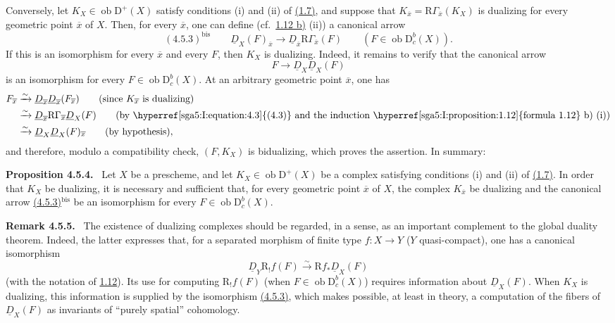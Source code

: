 \documentclass[11pt]{article}
\newenvironment{statement}[1]{\par\medskip\noindent\textbf{#1.}\ }{\par\medskip}
\newcommand{\R}{\mathrm{R}}
\newcommand{\D}{\mathrm{D}}
\newcommand{\ob}{\operatorname{ob}}
\newcommand{\ol}[1]{\overline{#1}}
\providecommand{\ob}{\operatorname{ob}}
\providecommand{\R}{\mathrm R}
\begin{document}
Conversely, let $K_X\in\ob\D^+(X)$ satisfy conditions (i) and (ii) of \hyperref[sga5:I:definition:1.7]{(1.7)}, and suppose that $K_{\ol{x}}=\R\Gamma_{\ol{x}}(K_X)$ is dualizing for every geometric point $\ol{x}$ of $X$. Then, for every $\ol{x}$, one can define (cf.~\hyperref[sga5:I:proposition:1.12]{1.12 b)} (ii)) a canonical arrow
\label{sga5:I:equation:4.5.3-mathrm-bis}\[
(4.5.3)^{\mathrm{bis}}\qquad \underline{D}_X(F)_{\ol{x}}\longrightarrow \underline{D}_{\ol{x}}\R\Gamma_{\ol{x}}(F)\qquad (F\in\ob\D_c^b(X)).
\]
If this is an isomorphism for every $\ol{x}$ and every $F$, then $K_X$ is dualizing. Indeed, it remains to verify that the canonical arrow
\[
F\longrightarrow \underline{D}_X\underline{D}_X(F)
\]
is an isomorphism for every $F\in\ob\D_c^b(X)$. At an arbitrary geometric point $\ol{x}$, one has
\[
\begin{aligned}
F_{\ol{x}}&\xrightarrow{\sim}\underline{D}_{\ol{x}}\underline{D}_{\ol{x}}(F_{\ol{x}})\qquad\text{(since $K_{\ol{x}}$ is dualizing)}\\
&\xrightarrow{\sim}\underline{D}_{\ol{x}}\R\Gamma_{\ol{x}}\underline{D}_X(F)\qquad\text{(by \hyperref[sga5:I:equation:4.3]{(4.3)} and the induction \hyperref[sga5:I:proposition:1.12]{formula 1.12} b) (i))}\\
&\xrightarrow{\sim}\underline{D}_X\underline{D}_X(F)_{\ol{x}}\qquad\text{(by hypothesis)},
\end{aligned}
\]
and therefore, modulo a compatibility check, $(F,K_X)$ is bidualizing, which proves the assertion. In summary:

\label{sga5:I:proposition:4.5.4}\begin{statement}{Proposition 4.5.4}
Let $X$ be a prescheme, and let $K_X\in\ob\D^+(X)$ be a complex satisfying conditions (i) and (ii) of \hyperref[sga5:I:definition:1.7]{(1.7)}. In order that $K_X$ be dualizing, it is necessary and sufficient that, for every geometric point $\ol{x}$ of $X$, the complex $K_{\ol{x}}$ be dualizing and the canonical arrow \hyperref[sga5:I:equation:4.5.3]{(4.5.3)}$^{\mathrm{bis}}$ be an isomorphism for every $F\in\ob\D_c^b(X)$.
\end{statement}

\label{sga5:I:remark:4.5.5}\begin{statement}{Remark 4.5.5}
The existence of dualizing complexes should be regarded, in a sense, as an important complement to the global duality theorem. Indeed, the latter expresses that, for a separated morphism of finite type $f:X\to Y$ ($Y$ quasi-compact), one has a canonical isomorphism
\[
\underline{D}_Y\R_!f(F)\xrightarrow{\sim}\R f_*\underline{D}_X(F)
\]
(with the notation of \hyperref[sga5:I:proposition:1.12]{1.12}). Its use for computing $\R_!f(F)$ (when $F\in\ob\D_c^b(X)$) requires information about $\underline{D}_X(F)$. When $K_X$ is dualizing, this information is supplied by the isomorphism \hyperref[sga5:I:equation:4.5.3]{(4.5.3)}, which makes possible, at least in theory, a computation of the fibers of $\underline{D}_X(F)$ as invariants of ``purely spatial'' cohomology.
\end{statement}
\end{document}
